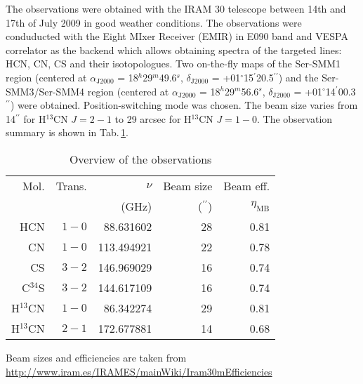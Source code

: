 \documentclass[a4paper]{article}
\begin{document}
\indent \indent The observations were obtained with the IRAM 30 telescope between 14th and 17th of July 2009 in good weather conditions. The observations were conduducted with the Eight MIxer Receiver (EMIR) in E090 band and VESPA correlator as the backend which allows obtaining spectra of the targeted lines: HCN, CN, CS and their isotopologues. Two on-the-fly maps of the Ser-SMM1 region (centered at $\alpha_\mathrm{J2000}$ = 18$^h$29$^m$49.6$^s$, $\delta_\mathrm{J2000}$ = +01$^{\circ}$15$^{\prime}$20.5$^{\prime\prime}$) and the Ser-SMM3/Ser-SMM4 region (centered at $\alpha_\mathrm{J2000}$ = 18$^h$29$^m$56.6$^s$, $\delta_\mathrm{J2000}$ = +01$^{\circ}$14$^{\prime}$00.3$^{\prime\prime}$) were obtained. Position-switching mode was chosen. The beam size varies from 14$^{\prime\prime}$ for H$^{13}$CN $J=2-1$ to 29 arcsec for H$^{13}$CN $J=1-0$. The observation summary is shown in Tab.\,\ref{tab:1}.
\begin{table}
\caption{Overview of the observations}             %
\label{tab:1}      %
\centering                          %
\begin{tabular}{r r r r r}        %
\hline\hline                 %
Mol. & Trans. & $\nu$ & Beam size & Beam eff.\\
 & & (GHz) & ($^{\prime\prime}$) & $\eta_\mathrm{MB}$\\
\hline                        %
HCN & $1-0$ & 88.631602 & 28 & 0.81\\
CN & $1-0$ & 113.494921 & 22 & 0.78\\
CS & $3-2$ & 146.969029 & 16 & 0.74\\
C$^{34}$S & $3-2$ & 144.617109 & 16 & 0.74\\
H$^{13}$CN & $1-0$ & 86.342274 & 29 & 0.81\\
H$^{13}$CN & $2-1$ & 172.677881 & 14 & 0.68\\
\hline                                   
\end{tabular}
\begin{flushleft}
Beam sizes and efficiencies are taken from \url{http://www.iram.es/IRAMES/mainWiki/Iram30mEfficiencies}
\end{flushleft}
\end{table}
\end{document}

